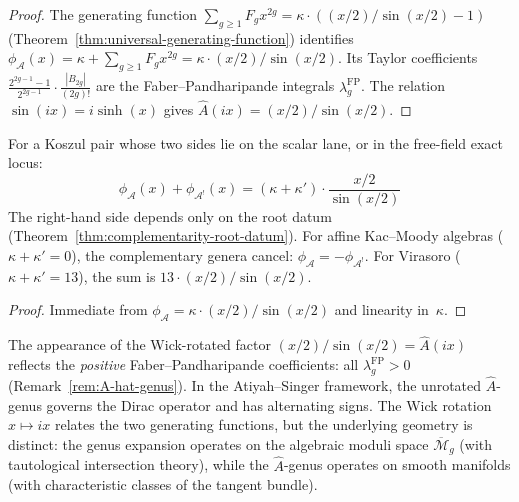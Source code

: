 \begin{proof}
The generating function
$\sum_{g \geq 1} F_g x^{2g}
= \kappa \cdot ((x/2)/\sin(x/2) - 1)$
(Theorem~\ref{thm:universal-generating-function}) identifies
$\phi_{\mathcal{A}}(x)
= \kappa + \sum_{g \geq 1} F_g x^{2g}
= \kappa \cdot (x/2)/\sin(x/2)$. Its Taylor coefficients
$\frac{2^{2g-1}-1}{2^{2g-1}} \cdot \frac{|B_{2g}|}{(2g)!}$
are the Faber--Pandharipande integrals
$\lambda_g^{\mathrm{FP}}$. The relation
$\sin(ix) = i\sinh(x)$ gives
$\hat{A}(ix)=(x/2)/\sin(x/2)$.
\end{proof}

\begin{corollary}
\label{cor:complementary-genera}
For a Koszul pair whose two sides lie on the scalar lane, or in the
free-field exact locus:
\begin{equation}\label{eq:genus-complementarity}
\phi_{\mathcal{A}}(x) + \phi_{\mathcal{A}^!}(x) = (\kappa + \kappa') \cdot \frac{x/2}{\sin(x/2)}
\end{equation}
The right-hand side depends only on the root datum \textup{(}Theorem~\textup{\ref{thm:complementarity-root-datum})}. For affine Kac--Moody algebras \textup{(}$\kappa + \kappa' = 0$\textup{)}, the complementary genera cancel: $\phi_{\mathcal{A}} = -\phi_{\mathcal{A}^!}$. For Virasoro \textup{(}$\kappa + \kappa' = 13$\textup{)}, the sum is $13 \cdot (x/2)/\sin(x/2)$.
\end{corollary}

\begin{proof}
Immediate from $\phi_{\mathcal{A}} = \kappa \cdot (x/2)/\sin(x/2)$ and linearity in~$\kappa$.
\end{proof}

\begin{remark}\label{rem:genus-index-theory}

The appearance of the Wick-rotated factor
$(x/2)/\sin(x/2)=\hat{A}(ix)$ reflects the \emph{positive}
Faber--Pandharipande coefficients: all
$\lambda_g^{\mathrm{FP}} > 0$ (Remark~\ref{rem:A-hat-genus}). In the
Atiyah--Singer framework, the unrotated $\hat{A}$-genus governs the
Dirac operator and has alternating signs. The Wick rotation
$x \mapsto ix$ relates the two generating functions, but the
underlying geometry is distinct: the genus expansion operates on the
algebraic moduli space $\overline{\mathcal{M}}_g$ (with
tautological intersection theory), while the $\hat{A}$-genus operates
on smooth manifolds (with characteristic classes of the tangent
bundle).
\end{remark}

